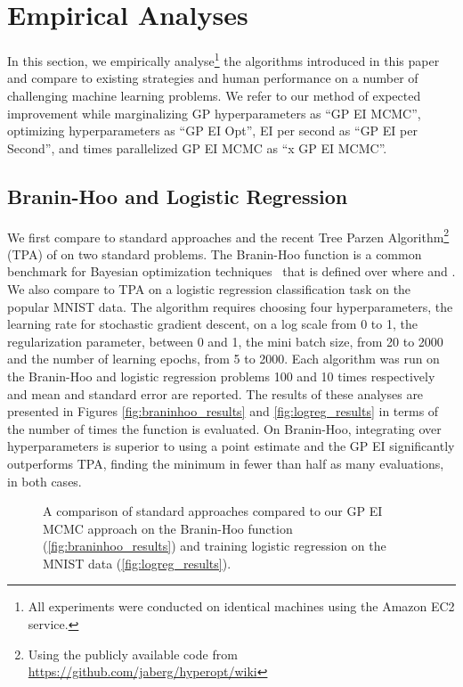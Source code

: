 \documentclass[aos,preprint]{imsart}
\begin{document}
\section{Empirical Analyses}
In this section, we empirically analyse\footnote{All experiments were
  conducted on identical machines using the Amazon EC2 service.} the
algorithms introduced in this paper and compare to existing strategies
and human performance on a number of challenging machine learning
problems.  We refer to our method of expected improvement while
marginalizing GP hyperparameters as ``GP EI MCMC'', optimizing
hyperparameters as ``GP EI Opt'', EI per second as ``GP EI per
Second'', and  times parallelized GP EI MCMC as ``x GP EI
MCMC''.

\label{sec:empirical}

\subsection{Branin-Hoo and Logistic Regression}
\label{sec:branin}
We first compare to standard approaches and the recent Tree Parzen
Algorithm\footnote{Using the publicly available code from
  \url{https://github.com/jaberg/hyperopt/wiki}} (TPA) of
\citet{BergstraJ2011} on two standard problems.  The Branin-Hoo
function is a common benchmark for Bayesian optimization
techniques~\citep{Jones2001} that is defined over 
where  and .  We also compare
to TPA on a logistic regression classification task on the popular
MNIST data. The algorithm requires choosing four hyperparameters, the
learning rate for stochastic gradient descent, on a log scale from 0
to 1, the~ regularization parameter, between 0 and 1, the mini batch
size, from 20 to 2000 and the number of learning epochs, from 5 to
2000.  Each algorithm was run on the Branin-Hoo and logistic
regression problems 100 and 10 times respectively and mean and
standard error are reported.  The results of these analyses are
presented in Figures \ref{fig:braninhoo_results} and
\ref{fig:logreg_results} in terms of the number of times the function
is evaluated.  On Branin-Hoo, integrating over hyperparameters
is superior to using a point estimate and the GP EI significantly
outperforms TPA, finding the minimum in fewer than half as many
evaluations, in both cases.

\begin{figure}[t]
\begin{center}

\end{center}
\caption{A comparison of standard approaches compared to our GP EI MCMC approach on the Branin-Hoo function (\ref{fig:braninhoo_results}) and training logistic regression on the MNIST data (\ref{fig:logreg_results}).}
\end{figure}
\end{document}
